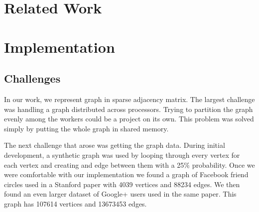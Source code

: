 \documentclass[11pt,a4paper,titlepage]{article}
\begin{document}



\section{Related Work} %
\label{sec:related-work}




\section{Implementation} %
\label{sec:data}


\subsection{Challenges}

In our work, we represent graph in sparse adjacency matrix. 
The largest challenge was handling a graph distributed across processors.
Trying to partition the graph evenly among the workers could be a project on
its own. This problem was solved simply by putting the whole graph in shared
memory.

The next challenge that arose was getting the graph data. During initial
development, a synthetic graph was used by looping through every vertex for
each vertex and creating and edge between them with a 25\% probability. Once we
were comfortable with our implementation we found a graph of Facebook friend
circles used in a Stanford paper \cite{leskovec2012learning} with 4039 vertices
and 88234 edges. We then found an even larger dataset of Google+ users used in
the same paper. This graph has 107614 vertices and 13673453 edges.
\end{document}
